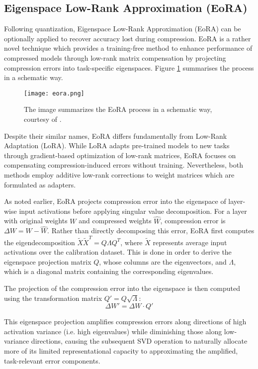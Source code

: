 \subsection{Eigenspace Low-Rank Approximation (EoRA)} \label{eora}

Following quantization, Eigenspace Low-Rank Approximation (EoRA) \cite{eora} can be optionally applied to recover accuracy lost during compression. EoRA is a rather novel technique which provides a training-free method to enhance performance of compressed models through low-rank matrix compensation by projecting compression errors into task-specific eigenspaces. Figure \ref{fig:eora} summarises the process in a schematic way.


\begin{figure}[htbp]
    \centering
    \texttt{[image: eora.png]}
    \caption[EoRA Overview]{The image summarizes the EoRA process in a schematic way, courtesy of \cite{eora}.}
    \label{fig:eora}
\end{figure}


Despite their similar names, EoRA differs fundamentally from Low-Rank Adaptation (LoRA). While LoRA adapts pre-trained models to new tasks through gradient-based optimization of low-rank matrices, EoRA focuses on compensating compression-induced errors without training. Nevertheless, both methods employ additive low-rank corrections to weight matrices which are formulated as adapters.

As noted earlier, EoRA projects compression error into the eigenspace of layer-wise input activations before applying singular value decomposition. For a layer with original weights $W$ and compressed weights $\hat{W}$, compression error is $\Delta W = W - \hat{W}$. Rather than directly decomposing this error, EoRA first computes the eigendecomposition $\tilde{X}\tilde{X}^T = Q\Lambda Q^T$, where $\tilde{X}$ represents average input activations over the calibration dataset. This is done in order to derive the eigenspace projection matrix $Q$, whose columns are the eigenvectors, and $\Lambda$, which is a diagonal matrix containing the corresponding eigenvalues.

The projection of the compression error into the eigenspace is then computed using the transformation matrix $Q' = Q\sqrt{\Lambda}$:
\begin{equation}
\Delta W' = \Delta W \cdot Q'
\end{equation}

This eigenspace projection amplifies compression errors along directions of high activation variance (i.e. high eigenvalues) while diminishing those along low-variance directions, causing the subsequent SVD operation to naturally allocate more of its limited representational capacity to approximating the amplified, task-relevant error components.

